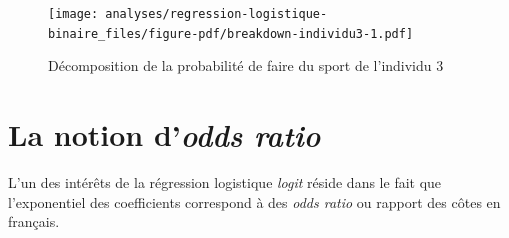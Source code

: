 \documentclass[
  letterpaper,
  DIV=11,
  numbers=noendperiod,
  oneside]{scrreprt}
\begin{document}
\begin{figure}[H]

{\centering \texttt{[image: analyses/regression-logistique-binaire\_files/figure-pdf/breakdown-individu3-1.pdf]}

}

\caption{Décomposition de la probabilité de faire du sport de l'individu
3}

\end{figure}

\hypertarget{la-notion-dodds-ratio}{%
\section{\texorpdfstring{La notion d'\emph{odds
ratio}}{La notion d'odds ratio}}\label{la-notion-dodds-ratio}}

L'un des intérêts de la régression logistique \emph{logit} réside dans
le fait que l'exponentiel des coefficients correspond à des \emph{odds
ratio} ou rapport des côtes en français.
\end{document}
